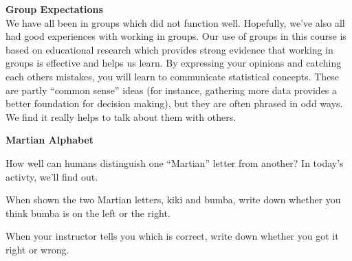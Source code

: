 
 {\bf Group Expectations }\\
 We have all been in groups which did not function well.  Hopefully,
 we've also all had good experiences with working in groups.  Our use
 of groups in this course is based on educational research which
 provides strong evidence that working in groups is effective and helps
 us learn.  By expressing your opinions and catching each others
 mistakes, you will learn to communicate statistical concepts.  These
 are partly ``common sense''
 ideas (for instance, gathering more data provides a better foundation
 for decision making),  but they are often  phrased in
 odd ways. We find it really helps to talk about them  with
 others. 



 \def\theTopic{Martian Alphabet}
\newpage


\begin{center}
{\bf  Martian Alphabet }\\
\end{center}
\vspace{-.2in}

How well can humans distinguish one ``Martian'' letter from another?
In today's activty, we'll find out.
 
When shown the two Martian letters, kiki and bumba, write down whether
you think bumba is on the left or the right. \vspace{1cm}


When your instructor  tells you which is correct, write down whether
you got it right or wrong. \vspace{1cm}


